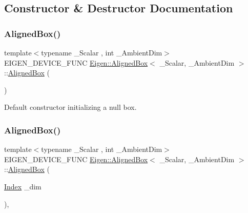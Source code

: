 \subsection{Constructor \& Destructor Documentation}
\mbox{\label{class_eigen_1_1_aligned_box_aeb7682d3d8676752e9b789b51d950872}} 
\subsubsection{\texorpdfstring{AlignedBox()}{AlignedBox()}\hspace{0.1cm}{\footnotesize\ttfamily [1/5]}}
{\footnotesize\ttfamily template$<$typename \+\_\+\+Scalar , int \+\_\+\+Ambient\+Dim$>$ \\
E\+I\+G\+E\+N\+\_\+\+D\+E\+V\+I\+C\+E\+\_\+\+F\+U\+NC \mbox{\hyperlink{class_eigen_1_1_aligned_box}{Eigen\+::\+Aligned\+Box}}$<$ \+\_\+\+Scalar, \+\_\+\+Ambient\+Dim $>$\+::\mbox{\hyperlink{class_eigen_1_1_aligned_box}{Aligned\+Box}} (\begin{DoxyParamCaption}{ }\end{DoxyParamCaption})\hspace{0.3cm}{\ttfamily [inline]}}

Default constructor initializing a null box. \mbox{\label{class_eigen_1_1_aligned_box_a23c536bbeb17416e4c39b1dd346408f6}} 
\subsubsection{\texorpdfstring{AlignedBox()}{AlignedBox()}\hspace{0.1cm}{\footnotesize\ttfamily [2/5]}}
{\footnotesize\ttfamily template$<$typename \+\_\+\+Scalar , int \+\_\+\+Ambient\+Dim$>$ \\
E\+I\+G\+E\+N\+\_\+\+D\+E\+V\+I\+C\+E\+\_\+\+F\+U\+NC \mbox{\hyperlink{class_eigen_1_1_aligned_box}{Eigen\+::\+Aligned\+Box}}$<$ \+\_\+\+Scalar, \+\_\+\+Ambient\+Dim $>$\+::\mbox{\hyperlink{class_eigen_1_1_aligned_box}{Aligned\+Box}} (\begin{DoxyParamCaption}\item[{\mbox{\hyperlink{class_eigen_1_1_aligned_box_a774ef355da13d6bee6a6e7244c15231a}{Index}}}]{\+\_\+dim }\end{DoxyParamCaption})\hspace{0.3cm}{\ttfamily [inline]}, {\ttfamily [explicit]}}

